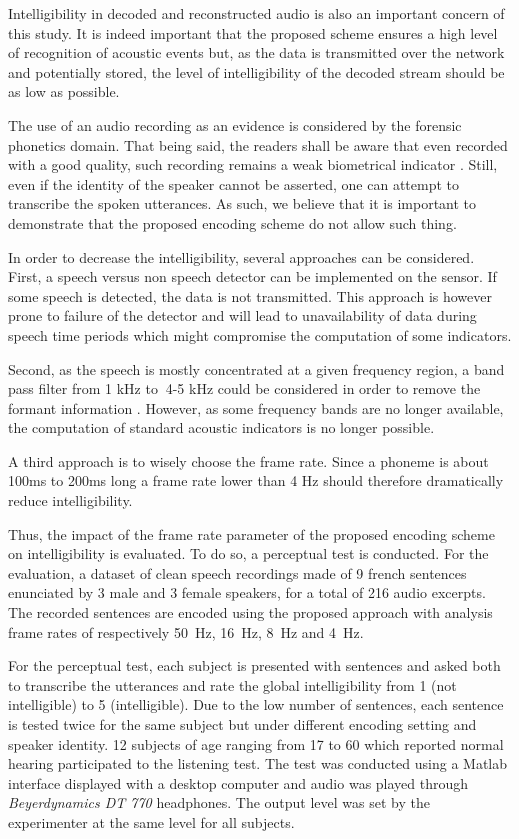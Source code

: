 \documentclass[final,3p,times,twocolumn]{elsarticle}
\begin{document}
Intelligibility in decoded and reconstructed audio is also an important concern of this study. It is indeed important that the proposed scheme ensures a high level of recognition of acoustic events but, as the data is transmitted over the network and potentially stored, the level of intelligibility of the decoded stream should be as low as possible.

The use of an audio recording as an evidence is considered by the forensic phonetics \cite{baldwin1990forensic} domain. That being said, the readers shall be aware that even recorded with a good quality, such recording remains a weak biometrical indicator \cite{boe2000forensic}. Still, even if the identity of the speaker cannot be asserted, one can attempt to transcribe the spoken utterances. As such, we believe that it is important to demonstrate that the proposed encoding scheme do not allow such thing.

In order to decrease the intelligibility, several approaches can be considered. First,  a speech versus non speech detector can be implemented on the sensor. If some speech is detected, the data is not transmitted. This approach is however prone to failure of the detector and will lead to unavailability of data during speech time periods which might compromise the computation of some indicators.

Second, as the speech is mostly concentrated at a given frequency region, a band pass filter from 1 kHz to $~$4-5 kHz could be considered in order to remove the formant information \cite{kent1992acoustic}. However, as some frequency bands are no longer available, the computation of standard acoustic indicators is no longer possible.

A third approach is to wisely choose the frame rate. Since a phoneme is about 100ms to 200ms long \cite{kuwabara1996acoustic} \cite{rosen1992temporal} a frame rate lower than 4 Hz should therefore dramatically reduce intelligibility.

Thus, the impact of the frame rate parameter of the proposed encoding scheme on intelligibility is evaluated. To do so, a perceptual test is conducted. For the evaluation, a dataset of clean speech recordings made of 9 french sentences enunciated by 3 male and 3 female speakers, for a total of 216 audio excerpts. The recorded sentences are encoded using the proposed approach with analysis frame rates of respectively 50~Hz, 16~Hz, 8~Hz and 4~Hz.

For the perceptual test, each subject is presented with sentences and asked both to transcribe the utterances and rate the global intelligibility from 1 (not intelligible) to 5 (intelligible). Due to the low number of sentences, each sentence is tested twice for the same subject but under different encoding setting and speaker identity. 12 subjects of age ranging from 17 to 60 which reported normal hearing participated to the listening test. The test was conducted using a Matlab interface displayed with a desktop computer and audio was played through \textit{Beyerdynamics DT 770} headphones. The output level was set by the experimenter at the same level for all subjects.
\end{document}
